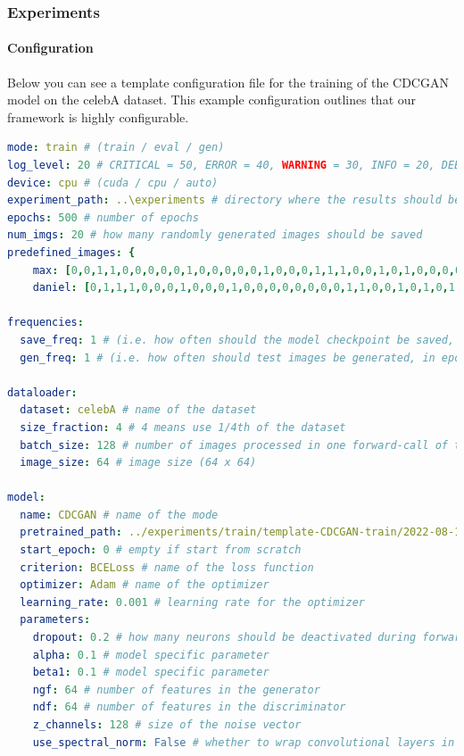 \documentclass[12pt, a4paper]{article}
\begin{document}
\subsubsection{Experiments}

\paragraph{Configuration}
\label{sec:config}

Below you can see a template configuration file for the training of the CDCGAN model on the celebA dataset.
This example configuration outlines that our framework is highly configurable. 

\begin{lstlisting}[language=yaml,
    basicstyle=\tiny,
]
mode: train # (train / eval / gen)
log_level: 20 # CRITICAL = 50, ERROR = 40, WARNING = 30, INFO = 20, DEBUG = 10, NOTSET = 0
device: cpu # (cuda / cpu / auto)
experiment_path: ..\experiments # directory where the results should be persisted
epochs: 500 # number of epochs
num_imgs: 20 # how many randomly generated images should be saved
predefined_images: {
    max: [0,0,1,1,0,0,0,0,0,1,0,0,0,0,0,1,0,0,0,1,1,1,0,0,1,0,1,0,0,0,0,1,0,0,0,0,0,0,0,1],
    daniel: [0,1,1,1,0,0,0,1,0,0,0,1,0,0,0,0,0,0,0,0,1,1,0,0,1,0,1,0,1,0,0,1,0,0,0,0,0,0,0,1]} # predefined attribute vectors for the image generation

frequencies:
  save_freq: 1 # (i.e. how often should the model checkpoint be saved, in epochs)
  gen_freq: 1 # (i.e. how often should test images be generated, in epochs)

dataloader:
  dataset: celebA # name of the dataset
  size_fraction: 4 # 4 means use 1/4th of the dataset
  batch_size: 128 # number of images processed in one forward-call of the models
  image_size: 64 # image size (64 x 64)

model:
  name: CDCGAN # name of the mode
  pretrained_path: ../experiments/train/template-CDCGAN-train/2022-08-10-10-08-52 # empty if start from scratch
  start_epoch: 0 # empty if start from scratch
  criterion: BCELoss # name of the loss function
  optimizer: Adam # name of the optimizer
  learning_rate: 0.001 # learning rate for the optimizer
  parameters:
    dropout: 0.2 # how many neurons should be deactivated during forwarding
    alpha: 0.1 # model specific parameter
    beta1: 0.1 # model specific parameter
    ngf: 64 # number of features in the generator
    ndf: 64 # number of features in the discriminator
    z_channels: 128 # size of the noise vector
    use_spectral_norm: False # whether to wrap convolutional layers in spectral_norm or not
\end{lstlisting}
\end{document}
